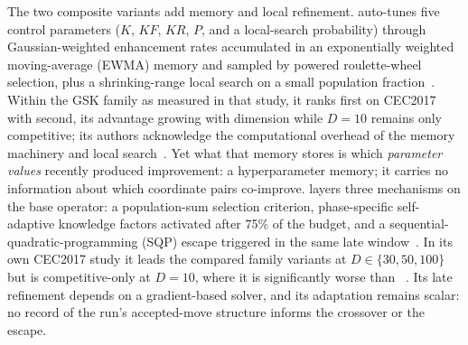 The two composite variants add memory and local refinement. \atmals{}
auto-tunes five control parameters ($K$, $KF$, $KR$, $P$, and a
local-search probability) through Gaussian-weighted enhancement rates
accumulated in an exponentially weighted moving-average (EWMA) memory and
sampled by powered roulette-wheel selection, plus a shrinking-range
local search on a small population
fraction~\cite{alfadli2025atmals}. %
Within the GSK family as measured in that study, it ranks first on
CEC2017 with \egsk{} second, its advantage growing with dimension while
$D = 10$ remains only competitive; its authors acknowledge the
computational overhead of the memory machinery and local
search~\cite{alfadli2025atmals}. %
Yet what that memory stores is which \emph{parameter values} recently
produced improvement: a hyperparameter memory; it carries no
information about which coordinate pairs co-improve. \egsk{} layers
three mechanisms on the base operator: a population-sum selection
criterion, phase-specific self-adaptive knowledge factors activated
after 75\% of the budget, and a sequential-quadratic-programming (SQP)
escape triggered in the same late
window~\cite{jawad2024egsk}. %
In its own CEC2017 study it leads the compared family variants at
$D \in \{30, 50, 100\}$ but is competitive-only at $D = 10$, where it is
significantly worse than
\agsk{}~\cite{jawad2024egsk}. %
Its late refinement depends on a gradient-based solver, and its
adaptation remains scalar: no record of the run's accepted-move
structure informs the crossover or the escape.

